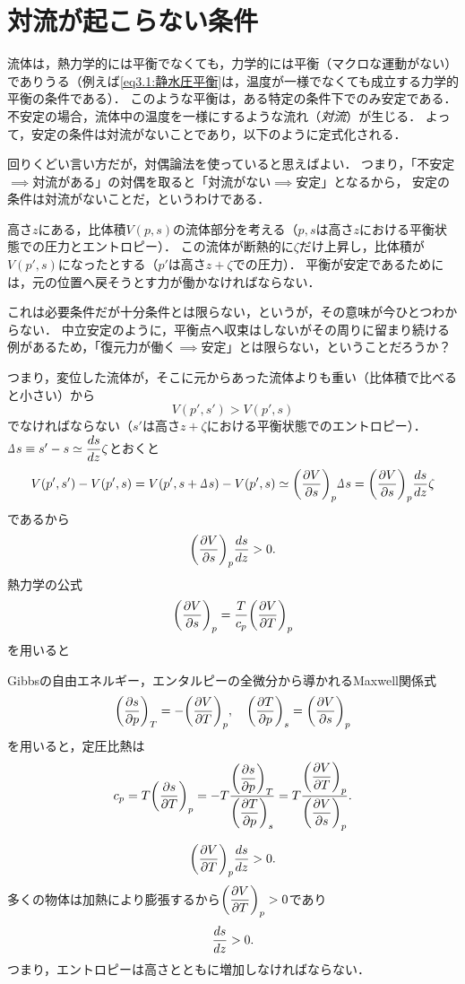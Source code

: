 \section{対流が起こらない条件}\label{sec:4}
流体は，熱力学的には平衡でなくても，力学的には平衡（マクロな運動がない）でありうる（例えば\eqref{eq3.1:静水圧平衡}は，温度が一様でなくても成立する力学的平衡の条件である）．
このような平衡は，ある特定の条件下でのみ安定である．
不安定の場合，流体中の温度を一様にするような流れ（\emph{対流}）が生じる．
よって，安定の条件は対流がないことであり，以下のように定式化される．
\begin{details}
回りくどい言い方だが，対偶論法を使っていると思えばよい．
つまり，「不安定$\implies$対流がある」の対偶を取ると「対流がない$\implies$安定」となるから，
安定の条件は対流がないことだ，というわけである．
\end{details}


高さ$z$にある，比体積$V(p,s)$の流体部分を考える（$p,s$は高さ$z$における平衡状態での圧力とエントロピー）．
この流体が断熱的に$\zeta$だけ上昇し，比体積が$V(p',s)$になったとする（$p'$は高さ$z+\zeta$での圧力）．
平衡が安定であるためには，元の位置へ戻そうとす力が働かなければならない．
\begin{details}
これは必要条件だが十分条件とは限らない，というが，その意味が今ひとつわからない．
中立安定のように，平衡点へ収束はしないがその周りに留まり続ける例があるため，「復元力が働く$\implies$安定」とは限らない，ということだろうか？
\end{details}
\noindent
つまり，変位した流体が，そこに元からあった流体よりも重い（比体積で比べると小さい）から
\[
    V(p',s') > V(p',s)
\]
でなければならない（$s'$は高さ$z+\zeta$における平衡状態でのエントロピー）．
$\D s \equiv s'-s \simeq \ddv{s}{z}\zeta$とおくと
\[
    V(p',s') - V(p',s) = V(p', s+\D s) - V(p',s) \simeq \PDV{V}{s}{p} \D s = \PDV{V}{s}{p} \dv{s}{z}\zeta
\]
であるから
\begin{equation}\label{eq4.1:対流がないときのエントロピー勾配の条件1}
    \PDV{V}{s}{p} \dv{s}{z} > 0.
\end{equation}
熱力学の公式
\[
    \PDV{V}{s}{p} = \frac{T}{c_p} \PDV{V}{T}{p}
\]
を用いると
\begin{details}
Gibbsの自由エネルギー，エンタルピーの全微分から導かれるMaxwell関係式
\[
    \PDV{s}{p}{T} = -\PDV{V}{T}{p}, \quad
    \PDV{T}{p}{s} = \PDV{V}{s}{p}
\]
を用いると，定圧比熱は
\[
    c_p = T\PDV{s}{T}{p} = -T \frac{ \dPDV{s}{p}{T} }{ \dPDV{T}{p}{s} } = T \frac{ \dPDV{V}{T}{p} }{ \dPDV{V}{s}{p} } .
\]
\end{details}
\begin{equation} 
    \PDV{V}{T}{p} \dv{s}{z} > 0.
\end{equation}
多くの物体は加熱により膨張するから$\dPDV{V}{T}{p}>0$であり
\begin{equation}
    \dv{s}{z} > 0.
\end{equation}
つまり，エントロピーは高さとともに増加しなければならない．

